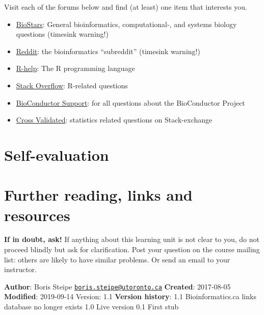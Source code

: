 \documentclass[]{book}
\providecommand{\tightlist}{%
  \setlength{\itemsep}{0pt}\setlength{\parskip}{0pt}}
\let\BeginKnitrBlock\begin \let\EndKnitrBlock\end
\begin{document}
\begin{rmd-task}
Visit each of the forums below and find (at least) one item that
interests you.

\begin{itemize}
\tightlist
\item
  \href{https://www.biostars.org/}{BioStars}: General bioinformatics,
  computational-, and systems biology questions (timesink warning!)
\item
  \href{https://www.reddit.com/r/bioinformatics/}{Reddit}: the
  bioinformatics ``subreddit'' (timesink warning!)
\item
  \href{https://stat.ethz.ch/mailman/listinfo/r-help}{R-help}: The R
  programming language
\item
  \href{https://stackoverflow.com/questions/tagged/r}{Stack Overflow}:
  R-related questions
\item
  \href{https://www.bioconductor.org/help/support/}{BioConductor
  Support}: for all questions about the BioConductor Project
\item
  \href{https://stats.stackexchange.com/}{Cross Validated}: statistics
  related questions on Stack-exchange
\end{itemize}
\end{rmd-task}

\section{Self-evaluation}\label{self-evaluation-5}

\section{Further reading, links and
resources}\label{further-reading-links-and-resources-7}

\textbf{If in doubt, ask!} If anything about this learning unit is not
clear to you, do not proceed blindly but ask for clarification. Post
your question on the course mailing list: others are likely to have
similar problems. Or send an email to your instructor.

\BeginKnitrBlock{rmd-original-history}
\textbf{Author}: Boris Steipe
\href{mailto:boris.steipe@utoronto.ca}{\nolinkurl{boris.steipe@utoronto.ca}}
\textbf{Created}: 2017-08-05 \textbf{Modified}: 2019-09-14 Version: 1.1
\textbf{Version history}: 1.1 Bioinformatics.ca links database no longer
exists 1.0 Live version 0.1 First stub
\EndKnitrBlock{rmd-original-history}
\end{document}
